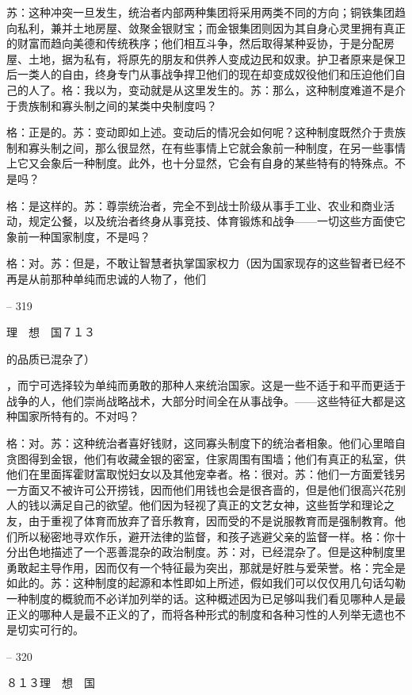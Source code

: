 \documentclass[11pt,oneside]{book}
\begin{document}
\begin{common-format}
    苏：这种冲突一旦发生，统治者内部两种集团将采用两类不同的方向；铜铁集团趋向私利，兼并土地房屋、敛聚金银财宝；而金银集团则因为其自身心灵里拥有真正的财富而趋向美德和传统秩序；他们相互斗争，然后取得某种妥协，于是分配房屋、土地，据为私有，将原先的朋友和供养人变成边民和奴隶。护卫者原来是保卫后一类人的自由，终身专门从事战争捍卫他们的现在却变成奴役他们和压迫他们自己的人了。格：我以为，变动就是从这里发生的。苏：那么，这种制度难道不是介于贵族制和寡头制之间的某类中央制度吗？

    格：正是的。苏：变动即如上述。变动后的情况会如何呢？这种制度既然介于贵族制和寡头制之间，那么很显然，在有些事情上它就会象前一种制度，在另一些事情上它又会象后一种制度。此外，也十分显然，它会有自身的某些特有的特殊点。不是吗？

    格：是这样的。苏：尊崇统治者，完全不到战士阶级从事手工业、农业和商业活动，规定公餐，以及统治者终身从事竞技、体育锻炼和战争——一切这些方面使它象前一种国家制度，不是吗？

    格：对。苏：但是，不敢让智慧者执掌国家权力（因为国家现存的这些智者已经不再是从前那种单纯而忠诚的人物了，他们

    

-- 319

    理　想　国７１３

    的品质已混杂了）

    ，而宁可选择较为单纯而勇敢的那种人来统治国家。这是一些不适于和平而更适于战争的人，他们崇尚战略战术，大部分时间全在从事战争。——这些特征大都是这种国家所特有的。不对吗？

    格：对。苏：这种统治者喜好钱财，这同寡头制度下的统治者相象。他们心里暗自贪图得到金银，他们有收藏金银的密室，住家周围有围墙；他们有真正的私室，供他们在里面挥霍财富取悦妇女以及其他宠幸者。格：很对。苏：他们一方面爱钱另一方面又不被许可公开捞钱，因而他们用钱也会是很吝啬的，但是他们很高兴花别人的钱以满足自己的欲望。他们因为轻视了真正的文艺女神，这些哲学和理论之友，由于重视了体育而放弃了音乐教育，因而受的不是说服教育而是强制教育。他们所以秘密地寻欢作乐，避开法律的监督，和孩子逃避父亲的监督一样。格：你十分出色地描述了一个恶善混杂的政治制度。苏：对，已经混杂了。但是这种制度里勇敢起主导作用，因而仅有一个特征最为突出，那就是好胜与爱荣誉。格：完全是如此的。苏：这种制度的起源和本性即如上所述，假如我们可以仅仅用几句话勾勒一种制度的概貌而不必详加列举的话。这种概述因为已足够叫我们看见哪种人是最正义的哪种人是最不正义的了，而将各种形式的制度和各种习性的人列举无遗也不是切实可行的。

    

-- 320

    ８１３理　想　国


\end{common-format}
\end{document}
